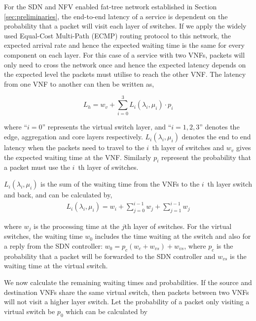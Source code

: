 For the SDN and NFV enabled fat-tree network established in Section \ref{sec:preliminaries}, the end-to-end latency of a service is dependent on the probability that a packet will visit each layer of switches. If we apply the widely used Equal-Cost Multi-Path (ECMP) \cite{ChiesaKS17} routing protocol to this network, the expected arrival rate and hence the expected waiting time is the same for every component on each layer. For this case of a service with two VNFs, packets will only need to cross the network once and hence the expected latency depends on the expected level the packets must utilise to reach the other VNF. The latency from one VNF to another can then be written as,

\begin{equation}
    \label{eq:mean_latency}
    L_h = w_v + \sum_{i=0}^3 L_i(\lambda_i, \mu_i) \cdot p_i
\end{equation}

\noindent where ``$i=0$'' represents the virtual switch layer, and ``$i=1,2,3$'' denotes the edge, aggregation and core layers respectively. $L_i(\lambda_i, \mu_i)$ denotes the end to end latency when the packets need to travel to the $i$~th layer of switches and $w_v$ gives the expected waiting time at the VNF. Similarly $p_i$ represent the probability that a packet must use the $i$~th layer of switches.

$L_i(\lambda_i, \mu_i)$ is the sum of the waiting time from the VNFs to the $i$~th layer switch and back, and can be calculated by,
\begin{equation}
    \label{eq:latency_path}
    \begin{split}
        L_i(\lambda_i, \mu_i) = w_i + \sum_{j=0}^{i-1} w_j + \sum_{j=1}^{i-1} w_j
    \end{split}
\end{equation}

\noindent where $w_j$ is the processing time at the $j$th layer of switches. For the virtual switches, the waiting time $w_0$ includes the time waiting at the switch and also for a reply from the SDN controller: $w_0 = p_c (w_c + w_{vs}) + w_{vs}$, where $p_c$ is the probability that a packet will be forwarded to the SDN controller and $w_{vs}$ is the waiting time at the virtual switch.

We now calculate the remaining waiting times and probabilities. If the source and destination VNFs share the same virtual switch, then packets between two VNFs will not visit a higher layer switch. Let the probability of a packet only visiting a virtual switch be $p_0$ which can be calculated by

